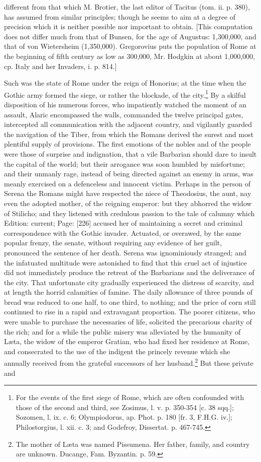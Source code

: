 {different from that which M. Brotier, the last editor of Tacitus (tom. ii. p. 380), has assumed from similar principles; though he seems to aim at a degree of precision which it is neither possible nor important to obtain. [This computation does not differ much from that of Bunsen, for the age of Augustus: 1,300,000, and that of von Wietersheim (1,350,000). Gregorovius puts the population of Rome at the beginning of fifth century as low as 300,000, Mr. Hodgkin at about 1,000,000, cp. Italy and her Invaders, i. p. 814.]}

Such was the state of Rome under the reign of Honorius; at the time when the Gothic army formed the siege, or rather the blockade, of the city.\footnote{For the events of the first siege of Rome, which are often confounded with those of the second and third, see Zosimus, l. v. p. 350-354 [c. 38 sqq.]; Sozomen, l. ix. c. 6; Olympiodorus, ap. Phot. p. 180 [fr. 3, F.H.G. iv.]; Philostorgius, l. xii. c. 3; and Godefroy, Dissertat. p. 467-745.} By a skilful disposition of his numerous forces, who impatiently watched the moment of an assault, Alaric encompassed the walls, commanded the twelve principal gates, intercepted all communication with the adjacent country, and vigilantly guarded the navigation of the Tiber, from which the Romans derived the surest and most plentiful supply of provisions. The first emotions of the nobles and of the people were those of surprise and indignation, that a vile Barbarian should dare to insult the capital of the world; but their arrogance was soon humbled by misfortune; and their unmanly rage, instead of being directed against an enemy in arms, was meanly exercised on a defenceless and innocent victim. Perhaps in the person of Serena the Romans might have respected the niece of Theodosius, the aunt, nay even the adopted mother, of the reigning emperor: but they abhorred the widow of Stilicho; and they listened with credulous passion to the tale of calumny which Edition: current; Page: [226] accused her of maintaining a secret and criminal correspondence with the Gothic invader. Actuated, or overawed, by the same popular frenzy, the senate, without requiring any evidence of her guilt, pronounced the sentence of her death. Serena was ignominiously stranged; and the infatuated multitude were astonished to find that this cruel act of injustice did not immediately produce the retreat of the Barbarians and the deliverance of the city. That unfortunate city gradually experienced the distress of scarcity, and at length the horrid calamities of famine. The daily allowance of three pounds of bread was reduced to one half, to one third, to nothing; and the price of corn still continued to rise in a rapid and extravagant proportion. The poorer citizens, who were unable to purchase the necessaries of life, solicited the precarious charity of the rich; and for a while the public misery was alleviated by the humanity of Læta, the widow of the emperor Gratian, who had fixed her residence at Rome, and consecrated to the use of the indigent the princely revenue which she annually received from the grateful successors of her husband.\footnote{The mother of Læta was named Pissumena. Her father, family, and country are unknown. Ducange, Fam. Byzantin. p. 59.} But these private and 